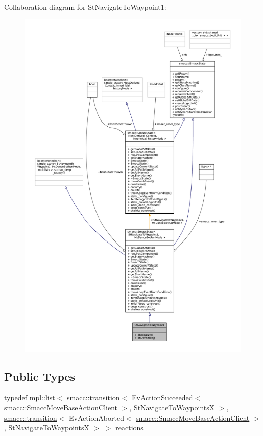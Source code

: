 Collaboration diagram for St\+Navigate\+To\+Waypoint1\+:
\nopagebreak
\begin{figure}[H]
\begin{center}
\leavevmode
\includegraphics[width=350pt]{structStNavigateToWaypoint1__coll__graph}
\end{center}
\end{figure}
\subsection*{Public Types}
\begin{DoxyCompactItemize}
\item 
typedef mpl\+::list$<$ \hyperlink{classsmacc_1_1transition}{smacc\+::transition}$<$ Ev\+Action\+Succeeded$<$ \hyperlink{classsmacc_1_1SmaccMoveBaseActionClient}{smacc\+::\+Smacc\+Move\+Base\+Action\+Client} $>$, \hyperlink{structStNavigateToWaypointsX}{St\+Navigate\+To\+WaypointsX} $>$, \hyperlink{classsmacc_1_1transition}{smacc\+::transition}$<$ Ev\+Action\+Aborted$<$ \hyperlink{classsmacc_1_1SmaccMoveBaseActionClient}{smacc\+::\+Smacc\+Move\+Base\+Action\+Client} $>$, \hyperlink{structStNavigateToWaypointsX}{St\+Navigate\+To\+WaypointsX} $>$ $>$ \hyperlink{structStNavigateToWaypoint1_a2ac6680a4d661d6e2998f68c69ab8efd}{reactions}
\end{DoxyCompactItemize}
